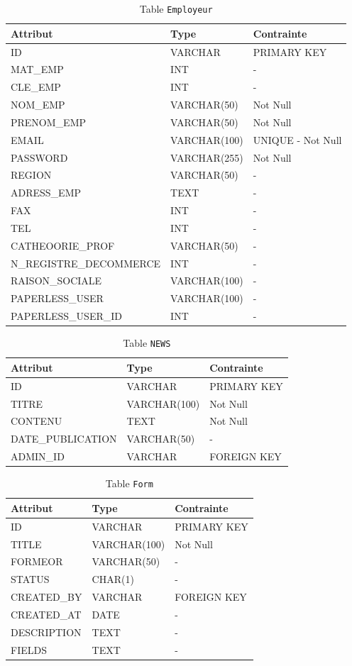 \begin{table}[h!]
\centering
\begin{tabular}{|l|l|l|}
\hline
\textbf{Attribut} & \textbf{Type} & \textbf{Contrainte} \\
\hline
ID & VARCHAR & PRIMARY KEY \\
MAT\_EMP & INT & - \\
CLE\_EMP & INT & - \\
NOM\_EMP & VARCHAR(50) & Not Null \\
PRENOM\_EMP & VARCHAR(50) & Not Null \\
EMAIL & VARCHAR(100) & UNIQUE - Not Null \\
PASSWORD & VARCHAR(255) & Not Null \\
REGION & VARCHAR(50) & - \\
ADRESS\_EMP & TEXT & - \\
FAX & INT & - \\
TEL & INT & - \\
CATHEOORIE\_PROF & VARCHAR(50) & - \\
N\_REGISTRE\_DECOMMERCE & INT & - \\
RAISON\_SOCIALE & VARCHAR(100) & - \\
PAPERLESS\_USER & VARCHAR(100) & - \\
PAPERLESS\_USER\_ID & INT & - \\
\hline
\end{tabular}
\caption{Table \texttt{Employeur}}
\end{table}

\begin{table}[h!]
\centering
\begin{tabular}{|l|l|l|}
\hline
\textbf{Attribut} & \textbf{Type} & \textbf{Contrainte} \\
\hline
ID & VARCHAR & PRIMARY KEY \\
TITRE & VARCHAR(100) & Not Null \\
CONTENU & TEXT & Not Null \\
DATE\_PUBLICATION & VARCHAR(50) & - \\
ADMIN\_ID & VARCHAR & FOREIGN KEY \\
\hline
\end{tabular}
\caption{Table \texttt{NEWS}}
\end{table}
\clearpage
\begin{table}[h!]
\centering
\begin{tabular}{|l|l|l|}
\hline
\textbf{Attribut} & \textbf{Type} & \textbf{Contrainte} \\
\hline
ID & VARCHAR & PRIMARY KEY \\
TITLE & VARCHAR(100) & Not Null \\
FORMEOR & VARCHAR(50) & - \\
STATUS & CHAR(1) & - \\
CREATED\_BY & VARCHAR & FOREIGN KEY \\
CREATED\_AT & DATE & - \\
DESCRIPTION & TEXT & - \\
FIELDS & TEXT & - \\
\hline
\end{tabular}
\caption{Table \texttt{Form}}
\end{table}
